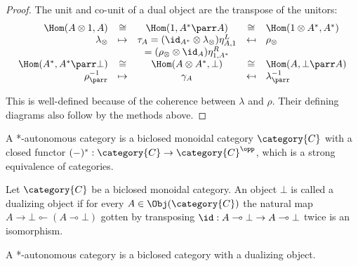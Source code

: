 \documentclass[DIN, pagenumber=false, fontsize=11pt, parskip=half, colorinlistoftodos, svgnames]{scrartcl}
\newcommand\mapsfrom{\mathrel{\reflectbox{\ensuremath{\mapsto}}}}
\begin{document}
\begin{proof}
		The unit and co-unit of a dual object are the transpose of the unitors:
		\begin{equation*}
			\begin{array}{rcccl}
					\Hom(A \otimes 1 ,A) 
					&\cong& 
					\Hom(1, A^* \parr A) 
					&\cong&
					\Hom(1 \otimes A^*, A^*)
				\\
					\lambda_\otimes
					&\mapsto&
					\tau_A 
					= (\id_{A^*} \otimes \lambda_\otimes)\eta^L_{A, 1}
					&\mapsfrom&
					\rho_\otimes
				\\
				&&
				= (\rho_\otimes \otimes \id_{A})\eta^R_{1, A^*}
				&&
				\\
					\Hom(A^*, A^* \parr \bot)
					&\cong &
					\Hom(A \otimes A^*, \bot)
					&\cong&
					\Hom(A, \bot \parr A)
				\\
					\rho_\parr^{-1}
					&\mapsto&
					\gamma_A
					&\mapsfrom&
					\lambda_\parr^{-1}
			\end{array}
		\end{equation*}
		
		This is well-defined because of the coherence between $\lambda$ and $\rho$.
		Their defining diagrams also follow by the methods above.
	\end{proof}
	
	
	\iffalse
	\begin{definition}
		\label{def: autoCatBarrA}
		A *-autonomous category is a biclosed monoidal category $\category{C} $ with a closed functor $(-)^*: \category{C} \rightarrow \category{C}^\opp $, which is a strong equivalence of categories.     
	\end{definition}
	
	\begin{definition}
		\label{def: dualizingObj}
		Let $\category{C} $ be a biclosed monoidal category. 
		An object $\bot $ is called a dualizing object if for every $A \in \Obj(\category{C}) $ the natural map $A \rightarrow \bot \multimapinv (A \multimap \bot) $ gotten by transposing $\id: A \multimap \bot \rightarrow A\multimap \bot $ twice is an isomorphism. 
	\end{definition}
	
	\begin{definition}
		\label{def: autoCatBarrB}
		A *-autonomous category is a biclosed category with a dualizing object.
	\end{definition}
	
\end{document}
